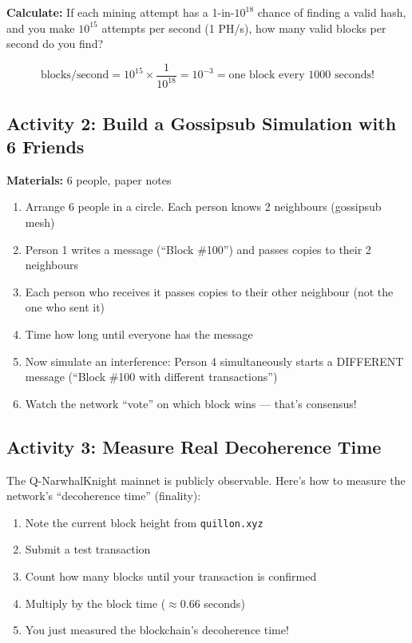 \documentclass[11pt,a4paper]{article}
\begin{document}
\textbf{Calculate:} If each mining attempt has a 1-in-$10^{18}$ chance of finding a valid hash, and you make $10^{15}$ attempts per second (1 PH/s), how many valid blocks per second do you find?

\begin{equation}
\text{blocks/second} = 10^{15} \times \frac{1}{10^{18}} = 10^{-3} = \text{one block every 1000 seconds!}
\end{equation}

\subsection{Activity 2: Build a Gossipsub Simulation with 6 Friends}

\textbf{Materials:} 6 people, paper notes

\begin{enumerate}
    \item Arrange 6 people in a circle. Each person knows 2 neighbours (gossipsub mesh)
    \item Person 1 writes a message (``Block \#100'') and passes copies to their 2 neighbours
    \item Each person who receives it passes copies to their other neighbour (not the one who sent it)
    \item Time how long until everyone has the message
    \item Now simulate an interference: Person 4 simultaneously starts a DIFFERENT message (``Block \#100 with different transactions'')
    \item Watch the network ``vote'' on which block wins --- that's consensus!
\end{enumerate}

\subsection{Activity 3: Measure Real Decoherence Time}

The Q-NarwhalKnight mainnet is publicly observable. Here's how to measure the network's ``decoherence time'' (finality):

\begin{enumerate}
    \item Note the current block height from \texttt{quillon.xyz}
    \item Submit a test transaction
    \item Count how many blocks until your transaction is confirmed
    \item Multiply by the block time ($\approx 0.66$ seconds)
    \item You just measured the blockchain's decoherence time!
\end{enumerate}
\end{document}
